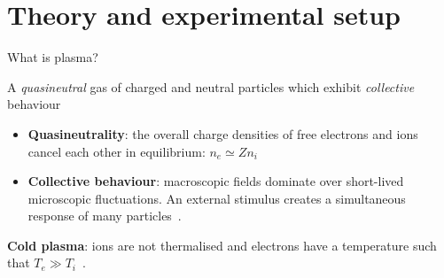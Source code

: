\documentclass[10pt]{beamer}
\begin{document}
\section{Theory and experimental setup}
\begin{frame}{What is plasma?}
    \begin{definition}
        A \emph{quasineutral} gas of charged and neutral particles which exhibit \emph{collective} behaviour\, 
        
    \end{definition}
    \vspace{0.3cm}
    \begin{itemize}
        \item \textbf{Quasineutrality}: the overall charge densities of free electrons and ions cancel each other in equilibrium: 
            $n_e \simeq Z n_i$\, 

        \item \textbf{Collective behaviour}: macroscopic fields dominate over short-lived microscopic fluctuations.
            An external stimulus creates a simultaneous response of many particles\, .
    \end{itemize}
    \vspace{0.5cm}
    \textbf{Cold plasma}: ions are not thermalised and electrons have a temperature such that $T_e \gg T_i$\, .
\end{frame}
\end{document}
